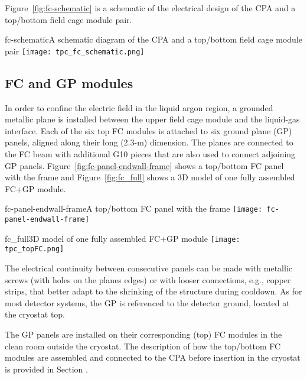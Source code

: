 Figure~\ref{fig:fc-schematic} is a schematic of the electrical design of  the CPA and a top/bottom field cage module pair.

\begin{cdrfigure}{fc-schematic}{A schematic diagram of the CPA and a top/bottom field cage module pair}
\texttt{[image: tpc\_fc\_schematic.png]}
\end{cdrfigure}

\subsection{FC and GP modules}

In order to confine the electric field in the liquid argon region, a grounded metallic plane is installed between the upper field cage module and the liquid-gas interface. 
Each of the six top FC modules is attached to six ground plane (GP) panels, aligned 
along their long %
(2.3-m) dimension. The planes are connected to the FC beam 
with additional 
G10 pieces that are also used to connect adjoining GP panels. 
Figure~\ref{fig:fc-panel-endwall-frame} shows a top/bottom FC panel with the frame and 
Figure~\ref{fig:fc_full} shows a 3D model of one fully assembled FC+GP module.

\begin{cdrfigure}{fc-panel-endwall-frame}{A top/bottom FC panel with the frame}
\texttt{[image: fc-panel-endwall-frame]}
\end{cdrfigure}

\begin{cdrfigure}{fc_full}{3D model of one fully assembled FC+GP module}
\texttt{[image: tpc\_topFC.png]}
\end{cdrfigure}

The electrical continuity between consecutive panels can be made 
with metallic screws (with holes on the planes edges) or with looser connections, e.g., copper strips, that better adapt to the shrinking of the structure during cooldown.  
As for most detector systems, the GP is  referenced to the detector ground, located at the cryostat top.

The GP panels are installed on their corresponding (top) FC modules in the clean room outside the cryostat. %
The description of how the top/bottom FC modules are assembled and connected to the CPA before insertion in the cryostat is provided in Section  .

